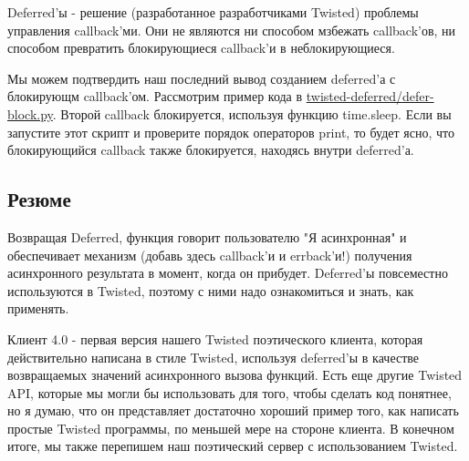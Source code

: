     Deferred'ы - решение (разработанное разработчиками Twisted) 
проблемы управления callback'ми. Они не являются ни способом 
мзбежать callback'ов, ни способом превратить блокирующиеся 
callback'и в неблокирующиеся. 


Мы можем подтвердить наш последний вывод созданием deferred'а 
с блокирующм callback'ом. Рассмотрим пример кода в 
\href{http://github.com/jdavisp3/twisted-intro/blob/master/twisted-deferred/defer-block.py}{twisted-deferred/defer-block.py}. 
Второй callback блокируется, используя функцию time.sleep. Если вы запустите 
этот скрипт и проверите порядок операторов print, то будет ясно, что 
блокирующийся callback также блокируется, находясь внутри deferred'а.


\subsection{Резюме}

Возвращая Deferred, функция говорит пользователю "Я асинхронная" и 
обеспечивает механизм (добавь здесь callback'и и errback'и!) 
получения асинхронного результата в момент, когда он прибудет. 
Deferred'ы повсеместно используются в Twisted, поэтому с ними 
надо ознакомиться и знать, как применять.


Клиент 4.0 - первая версия нашего Twisted поэтического 
клиента, которая действительно написана в стиле Twisted, 
используя deferred'ы в качестве возвращаемых значений 
асинхронного вызова функций. Есть еще другие Twisted API, 
которые мы могли бы использовать для того, чтобы сделать код 
понятнее, но я думаю, что он представляет достаточно 
хороший пример того, как написать простые Twisted программы, 
по меньшей мере на стороне клиента. В конечном итоге, мы 
также перепишем наш поэтический сервер с использованием Twisted. 


